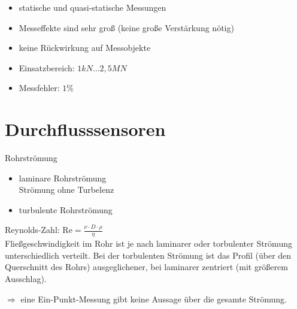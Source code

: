 \begin{itemize}
\item statische und quasi-statische Messungen
\item Messeffekte sind sehr groß (keine große Verstärkung nötig)
\item keine Rückwirkung auf Messobjekte
\item Einsatzbereich: $1 \unit{kN}\ldots 2,5 \unit{MN}$
\item Messfehler: $1\%$
\end{itemize}

\chapter{Durchflusssensoren}
Rohrströmung
\begin{itemize}
\item laminare Rohrströmung\\
Strömung ohne Turbelenz
\item turbulente Rohrströmung
\end{itemize}
Reynolds-Zahl: $\mathrm{Re}=\frac{\nu \cdot D \cdot \rho}{\eta}$\\
Fließgeschwindigkeit im Rohr ist je nach laminarer oder torbulenter Strömung unterschiedlich verteilt. Bei der torbulenten Strömung ist das Profil (über den Querschnitt des Rohrs) ausgeglichener, bei laminarer zentriert (mit größerem Ausschlag).

$\Rightarrow$ eine Ein-Punkt-Messung gibt keine Aussage über die gesamte Strömung.

